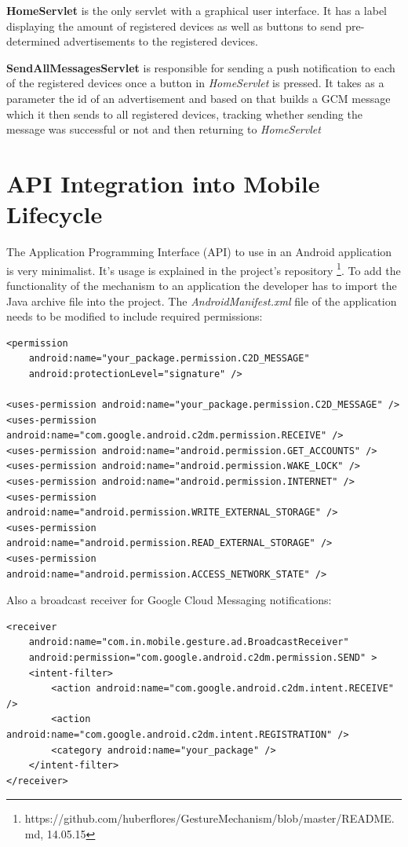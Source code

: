 \textbf{HomeServlet} is the only servlet with a graphical user interface. It has a label displaying the amount of registered devices as well as buttons to send pre-determined advertisements to the registered devices.

\textbf{SendAllMessagesServlet} is responsible for sending a push notification to each of the registered devices once a button in \textit{HomeServlet} is pressed. It takes as a parameter the id of an advertisement and based on that builds a GCM message which it then sends to all registered devices, tracking whether sending the message was successful or not and then returning to \textit{HomeServlet}

\section{API Integration into Mobile Lifecycle}

The Application Programming Interface (API) to use in an Android application is very minimalist. It's usage is explained in the project's repository \footnote[40]{https://github.com/huberflores/GestureMechanism/blob/master/README.md, 14.05.15}. To add the functionality of the mechanism to an application the developer has to import the Java archive file into the project. The \textit{AndroidManifest.xml} file of the application needs to be modified to include required permissions:

\lstset{language=XML}
\begin{lstlisting}
<permission
    android:name="your_package.permission.C2D_MESSAGE"
    android:protectionLevel="signature" />

<uses-permission android:name="your_package.permission.C2D_MESSAGE" />
<uses-permission android:name="com.google.android.c2dm.permission.RECEIVE" />
<uses-permission android:name="android.permission.GET_ACCOUNTS" />
<uses-permission android:name="android.permission.WAKE_LOCK" />
<uses-permission android:name="android.permission.INTERNET" />
<uses-permission android:name="android.permission.WRITE_EXTERNAL_STORAGE" />
<uses-permission android:name="android.permission.READ_EXTERNAL_STORAGE" />
<uses-permission android:name="android.permission.ACCESS_NETWORK_STATE" />
\end{lstlisting}

Also a broadcast receiver for Google Cloud Messaging notifications:

\begin{lstlisting}
<receiver
    android:name="com.in.mobile.gesture.ad.BroadcastReceiver"
    android:permission="com.google.android.c2dm.permission.SEND" >
    <intent-filter>
        <action android:name="com.google.android.c2dm.intent.RECEIVE" />
        <action android:name="com.google.android.c2dm.intent.REGISTRATION" />
        <category android:name="your_package" />
    </intent-filter>
</receiver>
\end{lstlisting}

